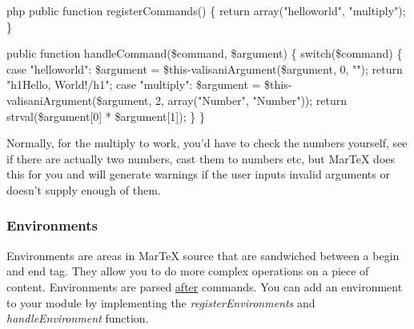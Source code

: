 \begin{code}{php}
public function registerCommands() \{
  return array("helloworld", "multiply");
\}

public function handleCommand(\$command, \$argument) \{
  switch(\$command) \{
    case "helloworld":
        \$argument = \$this-\>valisaniArgument(\$argument, 0, "");
        return "\<h1\>Hello, World!\</h1\>";
    case "multiply":
        \$argument = \$this-\>valisaniArgument(\$argument, 2, array("Number", "Number"));
        return strval(\$argument[0] * \$argument[1]);
    \}
\}
\end{code}
Normally, for the multiply to work, you'd have to check the numbers yourself, see if there are actually two numbers, cast them to numbers etc, but MarTeX does this for you and will generate warnings if the user inputs invalid arguments or doesn't supply enough of them.

\subsubsection{Environments}
Environments are areas in MarTeX source that are sandwiched between a begin and end tag. They allow you to do more complex operations on a piece of content. Environments are parsed \underline{after} commands. You can add an environment to your module by implementing the \textit{registerEnvironments} and \textit{handleEnvironment} function.



